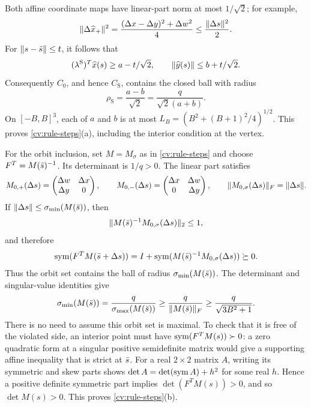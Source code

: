 Both affine coordinate maps have linear-part norm at most $1/\sqrt2$;
for example,
\[
 \lVert\Delta\widehat x_+\rVert^2
 =\frac{(\Delta x-\Delta y)^2+\Delta w^2}{4}
 \le\frac{\lVert\Delta s\rVert^2}{2}.
\]
For $\lVert s-\bar s\rVert\le t$, it follows that
\[
 (\lambda^{\mathrm S})^T\widehat x(s)\ge a-t/\sqrt2,
 \qquad \lVert\widehat y(s)\rVert\le b+t/\sqrt2.
\]
Consequently $C_0$, and hence $C_{\mathrm S}$, contains the closed ball
with radius
\begin{equation}\label{cv:scip-ball}
 \rho_{\mathrm S}=
 \frac{a-b}{\sqrt2}=\frac{q}{\sqrt2(a+b)}.
\end{equation}
On $[-B,B]^3$, each of $a$ and $b$ is at most
$L_B=(B^2+(B+1)^2/4)^{1/2}$. This proves
\cref{cv:rule-steps}(a), including the interior condition at the vertex.

For the orbit inclusion, set $M=M_\sigma$ as in
\cref{cv:rule-steps} and choose $F^T=M(\bar s)^{-1}$. Its determinant is
$1/q>0$. The linear part satisfies
\[
 M_{0,+}(\Delta s)=
   \begin{pmatrix}\Delta w&\Delta x\\\Delta y&0\end{pmatrix},\qquad
 M_{0,-}(\Delta s)=
   \begin{pmatrix}\Delta x&\Delta w\\0&\Delta y\end{pmatrix},\qquad
 \lVert M_{0,\sigma}(\Delta s)\rVert_F=\lVert\Delta s\rVert.
\]
If $\lVert\Delta s\rVert\le\sigma_{\min}(M(\bar s))$, then
\[
 \lVert M(\bar s)^{-1}M_{0,\sigma}(\Delta s)\rVert_2\le1,
\]
and therefore
\[
 \operatorname{sym}(F^TM(\bar s+\Delta s))
   =I+\operatorname{sym}(M(\bar s)^{-1}M_{0,\sigma}(\Delta s))\succeq0.
\]
Thus the orbit set contains the ball of radius
$\sigma_{\min}(M(\bar s))$. The determinant and singular-value identities
give
\begin{equation}\label{cv:orbit-ball}
 \sigma_{\min}(M(\bar s))
 =\frac{q}{\sigma_{\max}(M(\bar s))}
 \ge\frac{q}{\lVert M(\bar s)\rVert_F}
 \ge\frac{q}{\sqrt{3B^2+1}}.
\end{equation}
There is no need to assume this orbit set is maximal. To check that it is
free of the violated side, an interior point must have
$\operatorname{sym}(F^TM(s))\succ0$: a zero quadratic form at a singular positive
semidefinite matrix would give a supporting affine inequality that is
strict at $\bar s$. For a real $2\times2$ matrix $A$, writing its symmetric
and skew parts shows
$\det A=\det(\operatorname{sym} A)+h^2$ for some real $h$. Hence a positive definite
symmetric part implies $\det(F^TM(s))>0$, and so $\det M(s)>0$.
This proves \cref{cv:rule-steps}(b).

